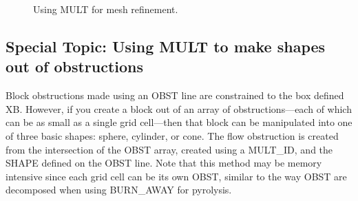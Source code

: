 \documentclass[11pt]{book}
\begin{document}
\begin{figure}[h!]
\centering


\caption[Using {\ct MULT} for mesh refinement]{Using {\ct MULT} for mesh refinement.}
\label{fig:multmeshrefine}

\end{figure}


\subsection{Special Topic: Using {\ct MULT} to make shapes out of obstructions}
\label{info:multobst}

Block obstructions made using an {\ct OBST} line are constrained to the box defined {\ct XB}.  However, if you create a block out of an array of obstructions---each of which can be as small as a single grid cell---then that block can be manipulated into one of three basic shapes: sphere, cylinder, or cone.  The flow obstruction is created from the intersection of the {\ct OBST} array, created using a {\ct MULT\_ID}, and the {\ct SHAPE} defined on the {\ct OBST} line.  Note that this method may be memory intensive since each grid cell can be its own {\ct OBST}, similar to the way {\ct OBST} are decomposed when using {\ct BURN\_AWAY} for pyrolysis.
\end{document}
